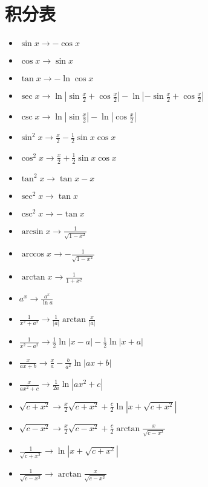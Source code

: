 \section{积分表}
	\begin{itemize}
		\item $ \sin x \to - \cos x $
		\item $ \cos x \to \sin x $
		\item $ \tan x \to - \ln \cos x $
		\item $ \sec x \to \ln \left| \sin \frac{x}{2} + \cos \frac{x}{2} \right| - \ln \left| -\sin \frac{x}{2} + \cos \frac{x}{2} \right| $
		\item $ \csc x \to \ln \left| \sin \frac{x}{2} \right| - \ln \left| \cos \frac{x}{2} \right|$
		\item $ \sin^2 x \to \frac{x}{2} - \frac{1}{2} \sin x \cos x $
		\item $ \cos^2 x \to \frac{x}{2} + \frac{1}{2} \sin x \cos x $
		\item $ \tan^2 x \to \tan x - x $
		\item $ \sec^2 x \to \tan x $
		\item $ \csc^2 x \to - \tan x $
		\item $ \arcsin x \to \frac{1}{\sqrt{1 - x^2}} $
		\item $ \arccos x \to - \frac{1}{\sqrt{1 - x^2}} $
		\item $ \arctan x \to \frac{1}{1 + x^2} $
		\item $ a^x \to \frac{a^x}{\ln a} $
		\item $ \frac{1}{x^2 + a^2} \to \frac{1}{\left| a \right|} \arctan \frac{x}{\left| a \right|} $
		\item $ \frac{1}{x^2 - a^2} \to \frac{1}{2} \ln \left| x - a \right| - \frac{1}{2} \ln \left| x + a \right| $
		\item $ \frac{x}{ax + b} \to \frac{x}{a} - \frac{b}{a^2} \ln \left| ax + b \right| $
		\item $ \frac{x}{ax^2 + c} \to \frac{1}{2a} \ln \left| ax^2 + c \right| $
		\item $ \sqrt{c + x^2} \to \frac{x}{2} \sqrt{c + x^2} + \frac{c}{2} \ln \left| x + \sqrt{c + x^2} \right| $
		\item $ \sqrt{c - x^2} \to \frac{x}{2} \sqrt{c - x^2} + \frac{c}{2} \arctan \frac{x}{\sqrt{c - x^2}} $
		\item $ \frac{1}{\sqrt{c + x^2}} \to \ln \left| x + \sqrt{c + x^2} \right| $
		\item $ \frac{1}{\sqrt{c - x^2}} \to \arctan \frac{x}{\sqrt{c - x^2}} $
	\end{itemize}
